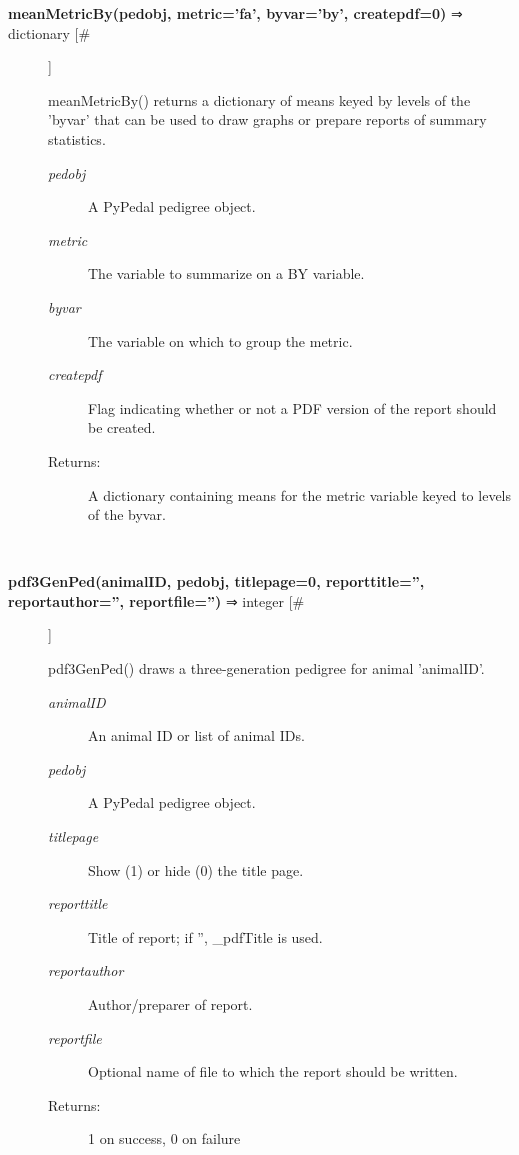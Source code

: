 \begin{description}
\item[\textbf{meanMetricBy(pedobj, metric='fa', byvar='by', createpdf=0)} ⇒ dictionary [\#]
]
\par meanMetricBy() returns a dictionary of means keyed by levels of the 'byvar' that
can be used to draw graphs or prepare reports of summary statistics.
\begin{description}
\item[\textit{pedobj}
]
A PyPedal pedigree object.
\item[\textit{metric}
]
The variable to summarize on a BY variable.
\item[\textit{byvar}
]
The variable on which to group the metric.
\item[\textit{createpdf}
]
Flag indicating whether or not a PDF version of the report should be created.
\item[Returns:
]
A dictionary containing means for the metric variable keyed to levels of the byvar.
\end{description}\\

\item[\textbf{pdf3GenPed(animalID, pedobj, titlepage=0, reporttitle='', reportauthor='', reportfile='')} ⇒ integer [\#]
]
\par pdf3GenPed() draws a three-generation pedigree for animal 'animalID'.
\begin{description}
\item[\textit{animalID}
]
An animal ID or list of animal IDs.
\item[\textit{pedobj}
]
A PyPedal pedigree object.
\item[\textit{titlepage}
]
Show (1) or hide (0) the title page.
\item[\textit{reporttitle}
]
Title of report; if '', \_pdfTitle is used.
\item[\textit{reportauthor}
]
Author/preparer of report.
\item[\textit{reportfile}
]
Optional name of file to which the report should be written.
\item[Returns:
]
1 on success, 0 on failure
\end{description}\\


\end{description}

